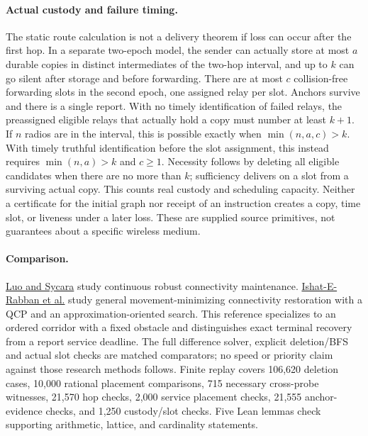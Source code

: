 \documentclass[11pt]{article}
\begin{document}
\paragraph{Actual custody and failure timing.}
The static route calculation is not a delivery theorem if loss can
occur after the first hop. In a separate two-epoch model, the sender can
actually store at most $a$ durable copies in distinct intermediates of the
two-hop interval, and up to $k$ can go silent after storage and before
forwarding. There are at most $c$ collision-free forwarding slots in
the second epoch, one assigned relay per slot. Anchors survive and there
is a single report. With no timely identification of failed relays, the
preassigned eligible relays that actually hold a copy must number at
least $k+1$. If $n$ radios are in the interval, this is possible exactly
when $\min(n,a,c)>k$. With timely truthful identification before the
slot assignment, this instead requires $\min(n,a)>k$ and $c\ge1$.
Necessity follows by deleting all eligible candidates when there are
no more than $k$; sufficiency delivers on a slot from a surviving actual
copy. This counts real custody and scheduling capacity. Neither a
certificate for the initial graph nor receipt of an instruction creates
a copy, time slot, or liveness under a later loss. These are supplied
source primitives, not guarantees about a specific wireless medium.

\paragraph{Comparison.}
\href{https://publications.ri.cmu.edu/minimum-k-connectivity-maintenance-for-robust-multi-robot-systems}{Luo and Sycara}
study continuous robust connectivity maintenance.
\href{https://arxiv.org/abs/2404.03834}{Ishat-E-Rabban et al.}
study general movement-minimizing connectivity restoration with a QCP
and an approximation-oriented search. This reference specializes to
an ordered corridor with a fixed obstacle and distinguishes exact
terminal recovery from a report service deadline. The full difference
solver, explicit deletion/BFS and actual slot checks are matched
comparators; no speed or priority claim against those research methods
follows. Finite replay covers 106,620 deletion cases, 10,000 rational
placement comparisons, 715 necessary cross-probe witnesses, 21,570
hop checks, 2,000 service placement checks, 21,555 anchor-evidence checks,
and 1,250 custody/slot checks. Five Lean lemmas check supporting
arithmetic, lattice, and cardinality statements.
\end{document}
